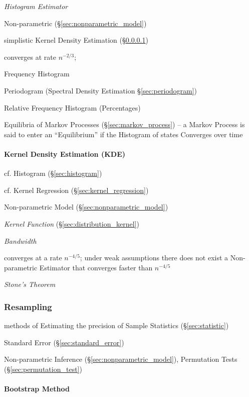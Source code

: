 \emph{Histogram Estimator}

Non-parametric (\S\ref{sec:nonparametric_model})

simplistic Kernel Density Estimation (\S\ref{sec:kde})

converges at rate $n^{-2/3}$;

Frequency Histogram

\fist Periodogram (Spectral Density Estimation \S\ref{sec:periodogram})

Relative Frequency Histogram (Percentages)

Equilibria of Markov Processes (\S\ref{sec:markov_process}) -- a Markov Process
is said to enter an ``Equilibrium'' if the Histogram of states Converges over
time



\paragraph{Kernel Density Estimation (KDE)}\label{sec:kde}\hfill

cf. Histogram (\S\ref{sec:histogram})

cf. Kernel Regression (\S\ref{sec:kernel_regression})

Non-parametric Model (\S\ref{sec:nonparametric_model})

\emph{Kernel Function} (\S\ref{sec:distribution_kernel})

\emph{Bandwidth}

converges at a rate $n^{-4/5}$;
under weak assumptions there does not exist a Non-parametric Estimator that
converges faster than $n^{-4/5}$

\emph{Stone's Theorem}



\subsubsection{Resampling}\label{sec:resampling}

methods of Estimating the precision of Sample Statistics (\S\ref{sec:statistic})

\fist Standard Error (\S\ref{sec:standard_error})

Non-parametric Inference (\S\ref{sec:nonparametric_model}), Permutation Tests
(\S\ref{sec:permutation_test})



\paragraph{Bootstrap Method}\label{sec:bootstrap_method}\hfill

